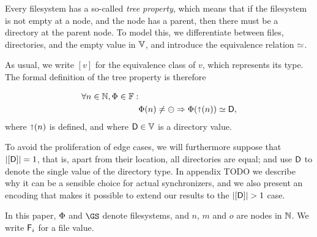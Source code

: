 

Every filesystem has a so-called \emph{tree property}, which means that
if the filesystem is not empty at a node, and the node has a parent,
then there must be a directory at the parent node.
To model this, we differentiate between files, directories, and the
empty value in $\mathbb{V}$, and introduce the equivalence relation
$\simeq$.


As usual, we write $[v]$ for the equivalence class of $v$, which represents its type.
The formal definition of the tree property is therefore
\begin{mydef}
\begin{align*}
\forall n\in\mathbb{N}, \Phi\in\mathbb{F}:& \\
& \Phi(n) \neq \ominus \Rightarrow \Phi(\mathord{\shortuparrow}(n)) \simeq \mathsf{D},
\end{align*}
where $\mathord{\shortuparrow}(n)$ is defined, and where $\mathsf{D}\in\mathbb{V}$ is a directory value.
\end{mydef}

To avoid the proliferation of edge cases, we will furthermore suppose that
$|[\mathsf{D}]|=1$, that is, apart from their location, all directories are equal;
and use $\mathsf{D}$ to denote the single value of the directory type.
In appendix TODO we describe why it can be a sensible choice
for actual synchronizers, and we also present an encoding that makes it possible
to extend our results to the $|\setd|>1$ case.


In this paper, $\Phi$ and $\GS$ denote filesystems,
and $n$, $m$ and $o$ are nodes in $\mathbb{N}$.
We write $\mathsf{F}_i$ for a file value. %

